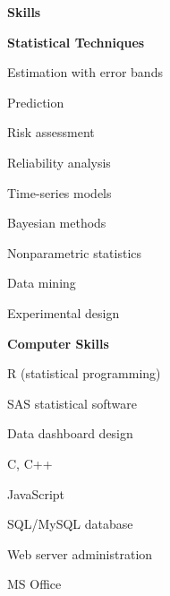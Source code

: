 \documentclass[letterpaper,12pt,final]{memoir}
\newcommand{\MedSep}{\vspace{1em}}
\newcommand{\SmallSep}{\vspace{0.5em}}
\newcommand{\CVSection}[1]
	{\Large\textbf{#1}\par
	\SmallSep\normalsize\normalfont}
\newcommand{\CVItem}[1]
	{\textbf{\color{RoyalBlue} #1}}
\begin{document}
\CVSection{Skills}
\CVItem{Statistical Techniques}
\begin{multicols}{3}
\begin{compactitem}[\color{RoyalBlue}$\bullet$]
	\item Estimation with error bands
  \item Prediction
	\item Risk assessment
  \item Reliability analysis
	\item Time-series models
	\item Bayesian methods
  \item Nonparametric statistics
	\item Data mining
	\item Experimental design
\end{compactitem}
\end{multicols}
\SmallSep
\CVItem{Computer Skills}
\begin{multicols}{3}
\begin{compactitem}[\color{RoyalBlue}$\bullet$]
	\item R (statistical programming)
  \item SAS statistical software
	\item Data dashboard design
	\item C, C++
	\item JavaScript
	\item SQL/MySQL database
  \item Web server administration
  \item MS Office
\end{compactitem}
\end{multicols}
\MedSep 
\end{document}
